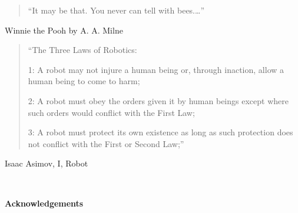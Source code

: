 \begin{quotation}
``It may be that. You never can tell with bees.\ldots''
\end{quotation}
\begin{flushright}
Winnie the Pooh by A. A. Milne
\end{flushright}

\vspace{1cm}

\begin{quotation}
``The Three Laws of Robotics:

1: A robot may not injure a human being or, through inaction, allow a human being to come to harm;

2: A robot must obey the orders given it by human beings except where such orders would conflict with the First Law;

3: A robot must protect its own existence as long as such protection does not conflict with the First or Second Law;''
\end{quotation}
\begin{flushright}
Isaac Asimov, I, Robot
\end{flushright}


\ 


\newpage

\begin{center}{\Large\bf Acknowledgements}\end{center}

\vspace{0.3cm}

